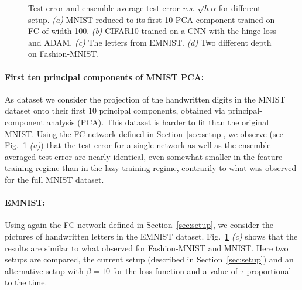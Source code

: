 \documentclass{article}
\newcommand{\eref}[1]{Eq.~(\ref{#1})}
\newcommand{\sref}[1]{Section~\ref{#1}}
\newcommand{\fref}[1]{Fig.~\ref{#1}}
\begin{document}
\begin{figure}[th!]
    \centering
    \caption{Test error and ensemble average test error \textit{v.s.} $\sqrt{h} \alpha$ for different setup. \emph{(a)} MNIST reduced to its first 10 PCA component trained on FC of width 100. \emph{(b)} CIFAR10 trained on a CNN with the hinge loss and ADAM. \emph{(c)} The letters from EMNIST. \emph{(d)} Two different depth on Fashion-MNIST.\label{fig:other}}
\end{figure}

\paragraph{First ten principal components of MNIST PCA:}
As dataset we consider the projection of the handwritten digits in the MNIST dataset onto their first 10 principal components, obtained via principal-component analysis (PCA).
This dataset is harder to fit than the original MNIST. 
Using the FC network defined in \sref{sec:setup}, we observe (see \fref{fig:other} \emph{(a)}) that the test error for a single network  as well as the ensemble-averaged test error are nearly identical, even somewhat smaller in the feature-training regime than in the lazy-training regime, contrarily to what was observed for the full MNIST dataset.

\paragraph{EMNIST:}
Using again the FC network defined in \sref{sec:setup}, we consider the pictures of handwritten letters in the EMNIST dataset.
\fref{fig:other} \emph{(c)} shows that the results are similar to what observed for Fashion-MNIST and MNIST.
Here two setups are compared, the current setup (described in \sref{sec:setup}) and an alternative setup with $\beta=10$ for the loss function and a value of $\tau$ proportional to the time.
\end{document}
